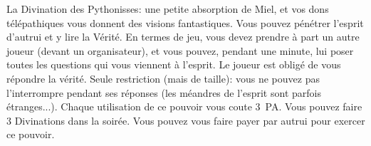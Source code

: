 \documentclass[14pt,twocolumn]{extarticle}
\begin{document}
La Divination des Pythonisses: une petite absorption de Miel, et vos dons
télépathiques vous donnent des visions fantastiques. Vous pouvez pénétrer
l'esprit d'autrui et y lire la Vérité. En termes de jeu, vous devez prendre à
part un autre joueur (devant un organisateur), et vous pouvez, pendant une
minute, lui poser toutes les questions qui vous viennent à l'esprit. Le joueur
est obligé de vous répondre la vérité. Seule restriction (mais de taille):
vous ne pouvez pas l'interrompre pendant ses réponses (les méandres de l'esprit
sont parfois étranges...). Chaque utilisation de ce pouvoir vous coute 3~PA.
Vous pouvez faire 3 Divinations dans la soirée. Vous pouvez vous faire payer
par autrui pour exercer ce pouvoir.
\end{document}
